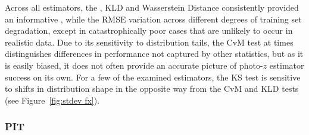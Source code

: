\documentclass[fleqn,usenatbib,useAMS]{mnras}
\newcommand{\PersonalTag}[3]{{\color{#2}{$^{#1}$ [#3}]}}
\newcommand{\aim}[1]{\PersonalTag{Alex}{violet}{#1}}
\newcommand{\refresponse}[1]{{\color{black}{#1}}}
\begin{document}
Across all estimators, the \refresponse{CvM}, KLD and Wasserstein Distance consistently provided an informative \refresponse{view on how algorithm performance depends on the training set incompleteness}, while the RMSE \refresponse{and KS test show little (or inconsistent)} variation across different degrees of training set degradation, except in catastrophically poor cases that are unlikely to occur in realistic data. 
Due to its sensitivity to distribution tails, the CvM test at times distinguishes differences in performance not captured by other statistics, but as it is easily biased, %
it does not often provide an accurate picture of photo-$z$ estimator success on its own. 
For a few of the examined estimators, the KS test is \refresponse{relatively insensitive to training set incompleteness except in truly catastrophic cases, but as noted previously, it has the advantage of being} sensitive to shifts in distribution shape in the opposite way from the CvM and KLD tests (see Figure~\ref{fig:stdev fx}). 


\subsubsection{PIT}
\end{document}
